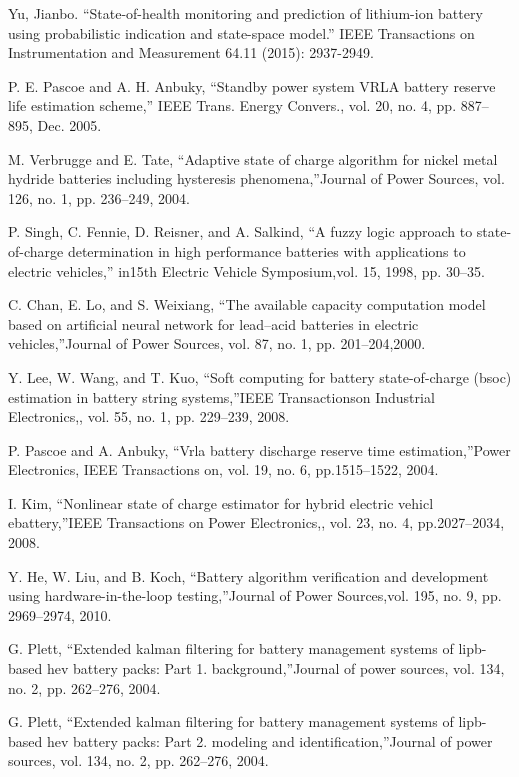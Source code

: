 Yu, Jianbo. ``State-of-health monitoring and prediction of lithium-ion battery using probabilistic indication and state-space model.'' IEEE Transactions on Instrumentation and Measurement 64.11 (2015): 2937-2949.

P. E. Pascoe and A. H. Anbuky, ``Standby power system VRLA battery
reserve life estimation scheme,” IEEE Trans. Energy Convers., vol. 20,
no. 4, pp. 887–895, Dec. 2005.

M.  Verbrugge  and  E.  Tate,  ``Adaptive  state  of  charge  algorithm  for nickel metal hydride batteries including hysteresis phenomena,”Journal of Power Sources, vol. 126, no. 1, pp. 236–249, 2004.

 P. Singh, C. Fennie, D. Reisner, and A. Salkind, ``A fuzzy logic approach to  state-of-charge  determination  in  high  performance  batteries  with applications  to  electric  vehicles,”  in15th  Electric  Vehicle  Symposium,vol. 15, 1998, pp. 30–35.

  C. Chan, E. Lo, and S. Weixiang, ``The available capacity computation model  based  on  artificial  neural  network  for  lead–acid  batteries  in electric vehicles,”Journal of Power Sources, vol. 87, no. 1, pp. 201–204,2000.

 Y.  Lee,  W.  Wang,  and  T.  Kuo,  ``Soft  computing  for  battery  state-of-charge (bsoc) estimation in battery string systems,”IEEE Transactionson Industrial Electronics,, vol. 55, no. 1, pp. 229–239, 2008.

 P.  Pascoe  and  A.  Anbuky,  ``Vrla  battery  discharge  reserve  time  estimation,”Power  Electronics,  IEEE  Transactions  on,  vol.  19,  no.  6,  pp.1515–1522, 2004.

 I. Kim, ``Nonlinear state of charge estimator for hybrid electric vehicl ebattery,”IEEE  Transactions  on  Power  Electronics,,  vol.  23,  no.  4,  pp.2027–2034, 2008.

 Y. He, W. Liu, and B. Koch, ``Battery algorithm verification and development using hardware-in-the-loop testing,”Journal of Power Sources,vol. 195, no. 9, pp. 2969–2974, 2010.

 G.  Plett,  ``Extended  kalman  filtering  for  battery  management  systems of lipb-based hev battery packs: Part 1. background,”Journal of power sources, vol. 134, no. 2, pp. 262–276, 2004.

G. Plett, ``Extended  kalman  filtering  for  battery  management  systems  of lipb-based  hev  battery  packs:  Part  2.  modeling  and  identification,”Journal of power sources, vol. 134, no. 2, pp. 262–276, 2004. 

